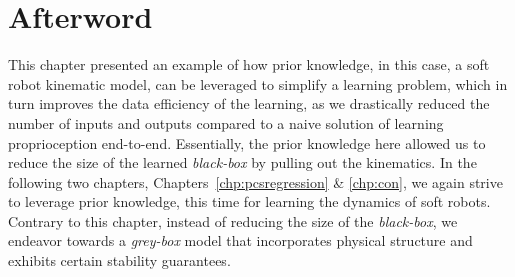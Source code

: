 \newpage








\section*{Afterword}
This chapter presented an example of how prior knowledge, in this case, a soft robot kinematic model, can be leveraged to simplify a learning problem, which in turn improves the data efficiency of the learning, as we drastically reduced the number of inputs and outputs compared to a naive solution of learning proprioception end-to-end.
Essentially, the prior knowledge here allowed us to reduce the size of the learned \emph{black-box} by pulling out the kinematics.
In the following two chapters, Chapters~\ref{chp:pcsregression} \& \ref{chp:con}, we again strive to leverage prior knowledge, this time for learning the dynamics of soft robots.
Contrary to this chapter, instead of reducing the size of the \emph{black-box}, we endeavor towards a \emph{grey-box} model that incorporates physical structure and exhibits certain stability guarantees.